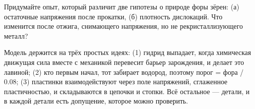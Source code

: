 \begin{exercise}
Придумайте опыт, который различит две гипотезы о природе форы зёрен: (а) остаточные
напряжения после прокатки, (б) плотность дислокаций. Что изменится после отжига, снимающего
напряжения, но не рекристаллизующего металл?
\end{exercise}

\begin{idea}[Итог]
Модель держится на трёх простых идеях: (1) гидрид выпадает, когда химическая движущая сила вместе
с механикой перевесит барьер зарождения, и делает это лавиной; (2) кто первым начал, тот забирает
водород, поэтому порог = фора / 0.08; (3) пластинки взаимодействуют через поле напряжений,
сглаженное пластичностью, и складываются в цепочки и стопки. Всё остальное --- детали, и в
каждой детали есть допущение, которое можно проверить.
\end{idea}
